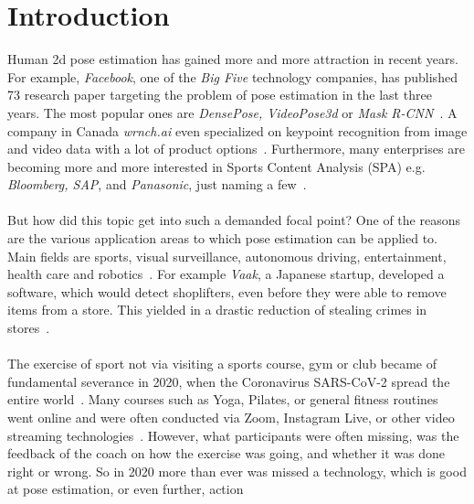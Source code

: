 


\chapter{Introduction} %

\label{introduction} %
Human 2d pose estimation has gained more and more attraction in recent years.
For example, \textit{Facebook}, one of the \textit{Big Five} technology companies, has published 73 research paper targeting the
problem of pose estimation in the last three years.
The most popular ones are \textit{DensePose, VideoPose3d} or \textit{Mask R-CNN}~\cite{fbPub, DensePose, videopose3d, maskrcnn}.
A company in Canada \textit{wrnch.ai} even specialized on keypoint recognition from image and video data with a
lot of product options~\cite{wrnch}.
Furthermore, many enterprises are becoming more and more interested in Sports Content Analysis (SPA)
e.g. \textit{Bloomberg, SAP}, and \textit{Panasonic}, just naming a few~\cite{sappanasonic, spaBloomberg}.
\\\mbox{}\\
But how did this topic get into such a demanded focal point?
One of the reasons are the various application areas to which pose estimation can be applied to.
Main fields are sports, visual surveillance, autonomous driving, entertainment, health care and
robotics~\cite{olympicsport, surveillance, kinectWalkDepression}.
For example \textit{Vaak}, a Japanese startup, developed a software, which would detect shoplifters,
even before they were able to remove items from a store.
This yielded in a drastic reduction of stealing crimes in stores~\cite{vaak}.
\\\mbox{}\\
The exercise of sport not via visiting a sports course, gym or club became of fundamental severance in 2020,
when the Coronavirus SARS-CoV-2 spread the entire world~\cite{coronarki}.
Many courses such as Yoga, Pilates, or general fitness routines went online
and were often conducted via Zoom, Instagram Live, or other video streaming technologies~\cite{coronalife}.
However, what participants were often missing, was the feedback of the coach on how the exercise was going, and
whether it was done right or wrong.
So in 2020 more than ever was missed a technology, which is good at pose estimation, or even further, action
